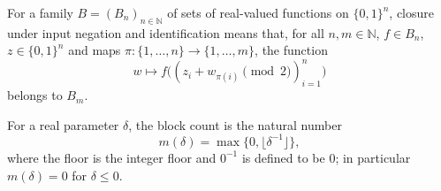 \begin{definition}
\leanok
{}
For a family $B=(B_n)_{n\in\mathbb N}$ of sets of real-valued functions on $\{0,1\}^{n}$, closure under input negation and identification means that, for all $n,m\in\mathbb N$, $f\in B_n$, $z\in\{0,1\}^{n}$ and maps $\pi:\{1,\ldots,n\}\to\{1,\ldots,m\}$, the function
\[
w\longmapsto f\bigl((z_i+w_{\pi(i)}\pmod2)_{i=1}^{n}\bigr)
\]
belongs to $B_m$.
\end{definition}

\begin{definition}
\leanok
For a real parameter $\delta$, the block count is the natural number
\[
m(\delta)=\max\{0,\lfloor\delta^{-1}\rfloor\},
\]
where the floor is the integer floor and $0^{-1}$ is defined to be $0$; in particular $m(\delta)=0$ for $\delta\leq0$.
\end{definition}

